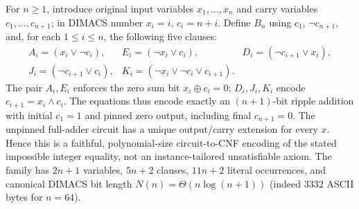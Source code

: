 \documentclass[11pt]{article}
\begin{document}
For $n\ge1$, introduce original input variables $x_1,\ldots,x_n$ and carry variables $c_1,\ldots,c_{n+1}$; in DIMACS number $x_i=i$, $c_i=n+i$. Define $B_n$ using $c_1$, $\neg c_{n+1}$, and, for each $1\le i\le n$, the following five clauses:
\[
\begin{array}{lll}
 A_i=(x_i\lor\neg c_i),&
 E_i=(\neg x_i\lor c_i),&
 D_i=(\neg c_{i+1}\lor x_i),\\
 J_i=(\neg c_{i+1}\lor c_i),&
 K_i=(\neg x_i\lor\neg c_i\lor c_{i+1}).
\end{array}
\]
The pair $A_i,E_i$ enforces the zero sum bit $x_i\oplus c_i=0$; $D_i,J_i,K_i$ encode $c_{i+1}=x_i\wedge c_i$. The equations thus encode exactly an $(n+1)$-bit ripple addition with initial $c_1=1$ and pinned zero output, including final $c_{n+1}=0$. The unpinned full-adder circuit has a unique output/carry extension for every $x$. Hence this is a faithful, polynomial-size circuit-to-CNF encoding of the stated impossible integer equality, not an instance-tailored unsatisfiable axiom. The family has $2n+1$ variables, $5n+2$ clauses, $11n+2$ literal occurrences, and canonical DIMACS bit length $N(n)=\Theta(n\log(n+1))$ (indeed $3332$ ASCII bytes for $n=64$).
\end{document}
